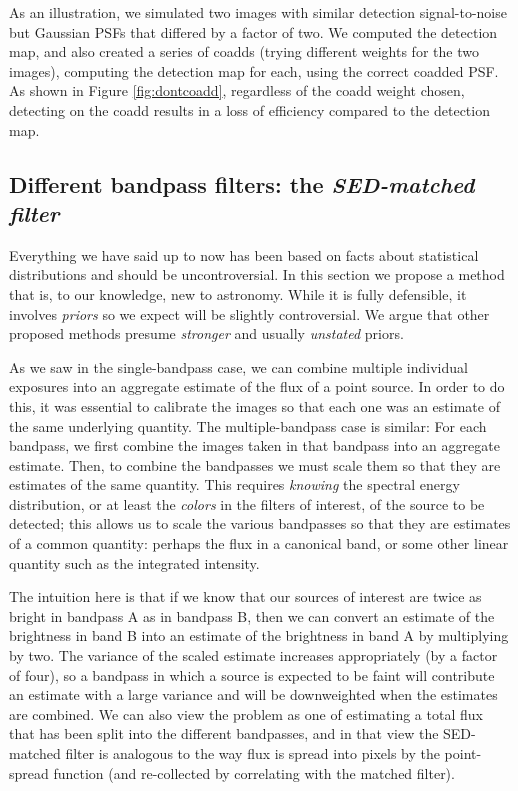 \documentclass[letterpaper,preprint]{aastex62}
\begin{document}
%
As an illustration, we simulated two images with similar detection
signal-to-noise but Gaussian PSFs that differed by a factor of two.
We computed the detection map, and also created a series of coadds
(trying different weights for the two images), computing the detection
map for each, using the correct coadded PSF.  As shown in Figure
\ref{fig:dontcoadd}, regardless of the coadd weight chosen, detecting
on the coadd results in a loss of efficiency compared to the detection
map.


\subsection{Different bandpass filters: the \emph{SED-matched filter}}

Everything we have said up to now has been based on facts about
statistical distributions and should be uncontroversial.  In this section we
propose a method that is, to our knowledge, new to astronomy.  While
it is fully defensible, it involves \emph{priors} so we expect will be
slightly controversial.  We argue that other proposed methods presume
\emph{stronger} and usually \emph{unstated} priors.

As we saw in the single-bandpass case, we can combine multiple
individual exposures into an aggregate estimate of the flux of a point
source.  In order to do this, it was essential to calibrate the images
so that each one was an estimate of the same underlying quantity.  The
multiple-bandpass case is similar: For each bandpass, we first combine
the images taken in that bandpass into an aggregate estimate.  Then,
to combine the bandpasses we must scale them so that they are
estimates of the same quantity.  This requires \emph{knowing} the
spectral energy distribution, or at least the \emph{colors} in the
filters of interest, of the source to be detected; this allows us to
scale the various bandpasses so that they are estimates of a common
quantity: perhaps the flux in a canonical band, or some other linear
quantity such as the integrated intensity.



The intuition here is that if we know that our sources of interest are
twice as bright in bandpass A as in bandpass B, then we can convert an
estimate of the brightness in band B into an estimate of the
brightness in band A by multiplying by two.  The variance of the
scaled estimate increases appropriately (by a factor of four), so a
bandpass in which a source is expected to be faint will contribute an
estimate with a large variance and will be downweighted when the
estimates are combined.  We can also view the problem as one of
estimating a total flux that has been split into the different
bandpasses, and in that view the SED-matched filter is analogous to
the way flux is spread into pixels by the point-spread function (and
re-collected by correlating with the matched filter).
\end{document}
